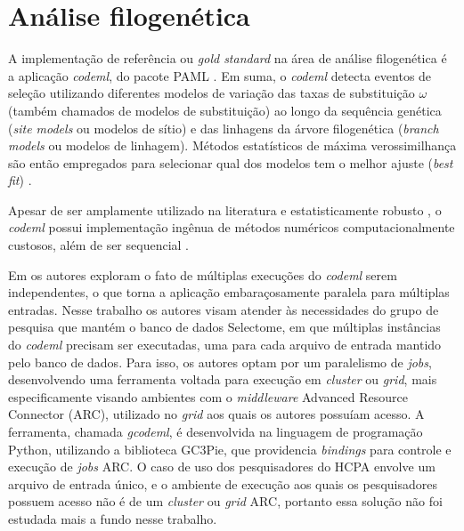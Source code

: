 \documentclass[cic,tc]{iiufrgs}
\begin{document}
\section{Análise filogenética}
\label{sec:filoant}

A implementação de referência ou \textit{gold standard} na área de análise
filogenética é a aplicação \textit{codeml}, do pacote PAML \cite{valle2014optimization}.
Em suma, o \textit{codeml} detecta eventos de seleção utilizando diferentes
modelos de variação das taxas de substituição $\omega$ (também chamados de
modelos de substituição) ao longo da sequência genética (\textit{site models}
ou modelos de sítio) e das linhagens da árvore filogenética (\textit{branch
models} ou modelos de linhagem). Métodos estatísticos de máxima verossimilhança
são então empregados para selecionar qual dos modelos tem o melhor ajuste
(\textit{best fit}) \cite{yang2007paml}. 

Apesar de ser amplamente utilizado na literatura e estatisticamente robusto
\cite{maldonado2016lmap}, o \textit{codeml} possui implementação ingênua de métodos
numéricos computacionalmente custosos, além de ser sequencial
\cite{yang2020paml}.

Em \cite{moretti2012gcodeml} os autores exploram o fato de múltiplas execuções
do \textit{codeml} serem independentes, o que torna a aplicação embaraçosamente
paralela para múltiplas entradas. Nesse trabalho os autores visam atender às
necessidades do grupo de pesquisa que mantém o banco de dados Selectome, em
que múltiplas instâncias do \textit{codeml} precisam ser executadas, uma para cada
arquivo de entrada mantido pelo banco de dados. Para isso, os autores optam
por um paralelismo de \textit{jobs}, desenvolvendo uma ferramenta voltada
para execução em \textit{cluster} ou \textit{grid}, mais especificamente
visando ambientes com o \textit{middleware} Advanced Resource Connector (ARC),
utilizado no \textit{grid} aos quais os autores possuíam acesso. A ferramenta,
chamada \textit{gcodeml}, é desenvolvida na linguagem de programação Python, utilizando
a biblioteca GC3Pie, que providencia \textit{bindings} para controle e execução
de \textit{jobs} ARC. O caso de uso dos pesquisadores do HCPA envolve um
arquivo de entrada único, e o ambiente de execução aos quais os pesquisadores
possuem acesso não é de um \textit{cluster} ou \textit{grid} ARC, portanto essa
solução não foi estudada mais a fundo nesse trabalho.
\end{document}

